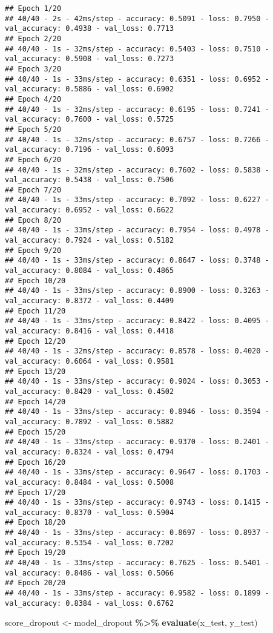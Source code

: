 \documentclass[
]{article}
\newenvironment{Shaded}{\begin{snugshade}}{\end{snugshade}}
\newcommand{\FunctionTok}[1]{\textcolor[rgb]{0.13,0.29,0.53}{\textbf{#1}}}
\newcommand{\NormalTok}[1]{#1}
\newcommand{\OtherTok}[1]{\textcolor[rgb]{0.56,0.35,0.01}{#1}}
\newcommand{\SpecialCharTok}[1]{\textcolor[rgb]{0.81,0.36,0.00}{\textbf{#1}}}
\begin{document}
\begin{verbatim}
## Epoch 1/20
## 40/40 - 2s - 42ms/step - accuracy: 0.5091 - loss: 0.7950 - val_accuracy: 0.4938 - val_loss: 0.7713
## Epoch 2/20
## 40/40 - 1s - 32ms/step - accuracy: 0.5403 - loss: 0.7510 - val_accuracy: 0.5908 - val_loss: 0.7273
## Epoch 3/20
## 40/40 - 1s - 33ms/step - accuracy: 0.6351 - loss: 0.6952 - val_accuracy: 0.5886 - val_loss: 0.6902
## Epoch 4/20
## 40/40 - 1s - 32ms/step - accuracy: 0.6195 - loss: 0.7241 - val_accuracy: 0.7600 - val_loss: 0.5725
## Epoch 5/20
## 40/40 - 1s - 32ms/step - accuracy: 0.6757 - loss: 0.7266 - val_accuracy: 0.7196 - val_loss: 0.6093
## Epoch 6/20
## 40/40 - 1s - 32ms/step - accuracy: 0.7602 - loss: 0.5838 - val_accuracy: 0.5438 - val_loss: 0.7506
## Epoch 7/20
## 40/40 - 1s - 33ms/step - accuracy: 0.7092 - loss: 0.6227 - val_accuracy: 0.6952 - val_loss: 0.6622
## Epoch 8/20
## 40/40 - 1s - 33ms/step - accuracy: 0.7954 - loss: 0.4978 - val_accuracy: 0.7924 - val_loss: 0.5182
## Epoch 9/20
## 40/40 - 1s - 33ms/step - accuracy: 0.8647 - loss: 0.3748 - val_accuracy: 0.8084 - val_loss: 0.4865
## Epoch 10/20
## 40/40 - 1s - 33ms/step - accuracy: 0.8900 - loss: 0.3263 - val_accuracy: 0.8372 - val_loss: 0.4409
## Epoch 11/20
## 40/40 - 1s - 33ms/step - accuracy: 0.8422 - loss: 0.4095 - val_accuracy: 0.8416 - val_loss: 0.4418
## Epoch 12/20
## 40/40 - 1s - 32ms/step - accuracy: 0.8578 - loss: 0.4020 - val_accuracy: 0.6064 - val_loss: 0.9581
## Epoch 13/20
## 40/40 - 1s - 33ms/step - accuracy: 0.9024 - loss: 0.3053 - val_accuracy: 0.8420 - val_loss: 0.4502
## Epoch 14/20
## 40/40 - 1s - 33ms/step - accuracy: 0.8946 - loss: 0.3594 - val_accuracy: 0.7892 - val_loss: 0.5882
## Epoch 15/20
## 40/40 - 1s - 33ms/step - accuracy: 0.9370 - loss: 0.2401 - val_accuracy: 0.8324 - val_loss: 0.4794
## Epoch 16/20
## 40/40 - 1s - 33ms/step - accuracy: 0.9647 - loss: 0.1703 - val_accuracy: 0.8484 - val_loss: 0.5008
## Epoch 17/20
## 40/40 - 1s - 33ms/step - accuracy: 0.9743 - loss: 0.1415 - val_accuracy: 0.8370 - val_loss: 0.5904
## Epoch 18/20
## 40/40 - 1s - 33ms/step - accuracy: 0.8697 - loss: 0.8937 - val_accuracy: 0.5354 - val_loss: 0.7202
## Epoch 19/20
## 40/40 - 1s - 33ms/step - accuracy: 0.7625 - loss: 0.5401 - val_accuracy: 0.8486 - val_loss: 0.5066
## Epoch 20/20
## 40/40 - 1s - 33ms/step - accuracy: 0.9582 - loss: 0.1899 - val_accuracy: 0.8384 - val_loss: 0.6762
\end{verbatim}

\begin{Shaded}
\begin{Highlighting}[]
\NormalTok{score\_dropout }\OtherTok{\textless{}{-}}\NormalTok{ model\_dropout }\SpecialCharTok{\%\textgreater{}\%} \FunctionTok{evaluate}\NormalTok{(x\_test, y\_test)}
\end{Highlighting}
\end{Shaded}
\end{document}
